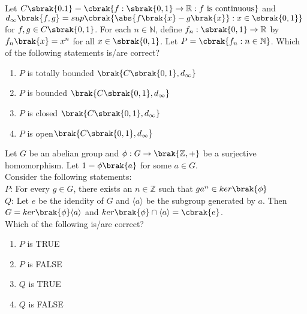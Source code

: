 \iffalse
	\title{2023-MA-53-65}
	\author{EE24Btech11006 - Arnav Mahishi}
	\section{ma}
	\chapter{2023}
\fi
\item{
Let $C\sbrak{0.1}=\cbrak{f:\sbrak{0,1}\rightarrow\mathbb{R}:f\text{ is continuous}}$ and $d_{\infty}\brak{f,g}=sup\cbrak{\abs{f\brak{x}-g\brak{x}}:x\in\sbrak{0,1}}$ for $f,g\in C\sbrak{0,1}$. For each $n\in\mathbb{N}$, define $f_n:\sbrak{0,1}\rightarrow\mathbb{R}$ by $f_n\brak{x}=x^n$ for all $x\in\sbrak{0,1}$. Let $P=\cbrak{f_n:n\in\mathbb{N}}$. Which of the following statements is/are correct? 
\begin{multicols}{2}
\begin{enumerate}
\item $P$ is totally bounded $\brak{C\sbrak{0,1},d_\infty}$
\item $P$ is bounded $\brak{C\sbrak{0,1},d_\infty}$
\item $P$ is closed $\brak{C\sbrak{0,1},d_\infty}$
\item $P$ is open$\brak{C\sbrak{0,1},d_\infty}$
\end{enumerate}
\end{multicols}
}
\item{
Let $G$ be an abelian group and $\phi:G\rightarrow\brak{\mathbb{Z},+}$ be a surjective homomorphism. Let $1=\phi\brak{a}$ for some $a\in G$.\\
Consider the following statements:\\
$P$: For every $g\in G$, there exists an $n\in\mathbb{Z}$ such that $ga^n\in ker\brak{\phi}$\\
$Q$: Let $e$ be the idendity of $G$ and $\langle a\rangle$ be the subgroup generated by $a$. Then $G=ker\brak{\phi}\langle a\rangle$ and $ker\brak{\phi}\cap\langle a\rangle=\cbrak{e}$.\\
Which of the following is/are correct?
\begin{multicols}{4}
\begin{enumerate}
\item $P$ is TRUE
\item $P$ is FALSE 
\item $Q$ is TRUE
\item $Q$ is FALSE
\end{enumerate}
\end{multicols}}
